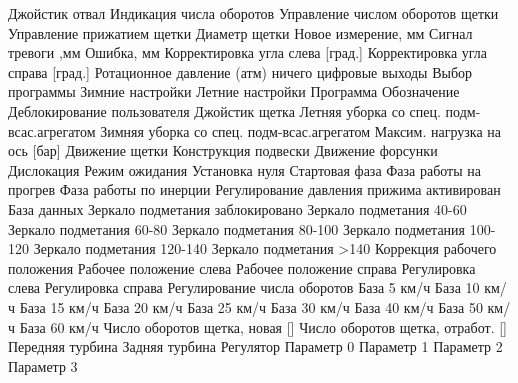  {Джойстик отвал}
 {Индикация числа оборотов}
 {Управление числом оборотов щетки}
 {Управление прижатием щетки}
 {Диаметр щетки}
 {Новое измерение, мм}
 {Сигнал тревоги ,мм}
 {Ошибка, мм}
 {Корректировка угла слева [град.]}
 {Корректировка угла справа [град.]}
 {Ротационное давление (атм)}
 {ничего}
 {цифровые выходы}
 {Выбор программы}
 {Зимние настройки}
 {Летние настройки}
 {Программа}
 {Обозначение}
 {Деблокирование пользователя}
 {Джойстик щетка}
 {Летняя уборка со спец. подм-всас.агрегатом}
 {Зимняя уборка со спец. подм-всас.агрегатом}
 {Максим. нагрузка на ось [бар]}
 {Движение щетки}
 {Конструкция подвески}
 {Движение форсунки}
 {Дислокация}
 {Режим ожидания}
 {Установка нуля}
 {Стартовая фаза}
 {Фаза работы на прогрев}
 {Фаза работы по инерции}
 {Регулирование давления прижима}
 {активирован}
 {База данных}
 {Зеркало подметания}
 {заблокировано}
 {Зеркало подметания 40-60}
 {Зеркало подметания 60-80}
 {Зеркало подметания 80-100}
 {Зеркало подметания 100-120}
 {Зеркало подметания 120-140}
 {Зеркало подметания >140}
 {Коррекция рабочего положения}
 {Рабочее положение слева}
 {Рабочее положение справа}
 {Регулировка слева}
 {Регулировка справа}
 {Регулирование числа оборотов}
 {База 5 км/ч}
 {База 10 км/ч}
 {База 15 км/ч}
 {База 20 км/ч}
 {База 25 км/ч}
 {База 30 км/ч}
 {База 40 км/ч}
 {База 50 км/ч}
 {База 60 км/ч}
 {Число оборотов щетка, новая [\percent ]}
 {Число оборотов щетка, отработ. [\percent ]}
 {Передняя турбина}
 {Задняя турбина}
 {Регулятор}
 {Параметр 0}
 {Параметр 1}
 {Параметр 2}
 {Параметр 3}
